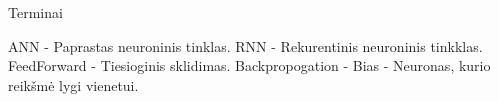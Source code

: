 Terminai

ANN - Paprastas neuroninis tinklas.
RNN - Rekurentinis neuroninis tinkklas.
FeedForward - Tiesioginis sklidimas.
Backpropogation -
Bias - Neuronas, kurio reikšmė lygi vienetui.
